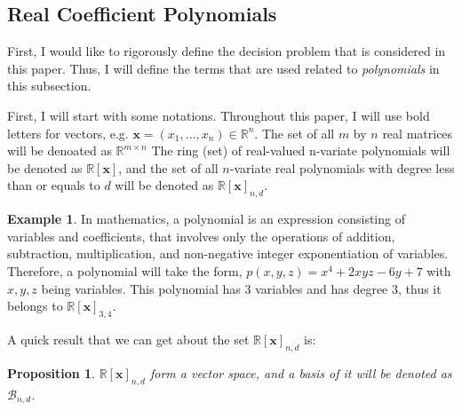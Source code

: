 \documentclass[12pt]{amsart}
\numberwithin{equation}{section}
\newtheorem{prop}[thm]{Proposition}
\theoremstyle{definition}
\newtheorem{example}[thm]{Example}
\numberwithin{thm}{section}
\begin{document}

\subsection{Real Coefficient Polynomials}
\label{Sec:Real Coefficient Polynomials}
First, I would like to rigorously define the decision problem that is considered in this paper. 
Thus, I will define the terms that are used related to \emph{polynomials} in this subsection. 

First, I will start with some notations. Throughout this paper, I will use bold letters for vectors, e.g. $\mathbf{x} = (x_1, ..., x_n) \in \mathbb{R}^n$.
The set of all $m$ by $n$ real matrices will be denoated as $\mathbb{R}^{m \times n}$ 
The ring (set) of real-valued n-variate polynomials will be denoted as $\mathbb{R}[\mathbf{x}]$, 
and the set of all $n$-variate real polynomials with degree less than or equals to $d$ will be denoted as $\mathbb{R}[\mathbf{x}]_{n, d}$. 

\begin{example}
     In mathematics, a polynomial is an expression consisting of variables and coefficients, that involves only the operations of addition, subtraction, multiplication, and non-negative integer exponentiation of variables.
     Therefore, a polynomial will take the form, 
     $p(x, y, z) = x^4 + 2xyz - 6y + 7$ with $x, y, z$ being variables. This polynomial has $3$ variables and has degree $3$, thus it 
     belongs to $\mathbb{R}[\mathbf{x}]_{3, 4}$.
\end{example}

A quick result that we can get about the set $\mathbb{R}[\mathbf{x}]_{n, d}$ is:
\begin{prop}
     \label{prop:vs}
     $\mathbb{R}[\mathbf{x}]_{n, d}$ form a vector space, and a basis of it will be denoted as $\mathcal{B}_{n, d}$.
\end{prop}
    
\end{document}
